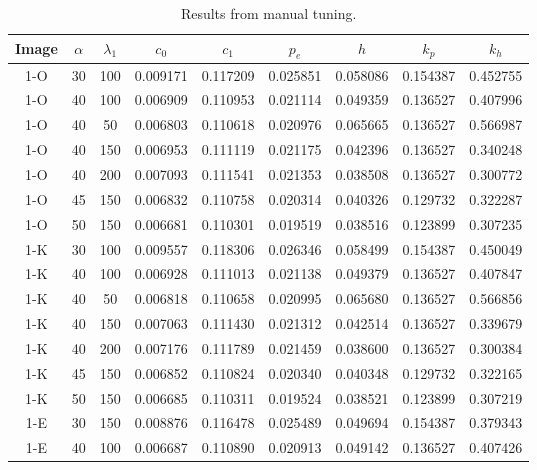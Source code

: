 \begin{center}
	\begin{longtable}{|c|c|c|c|c|c|c|c|c|}
	\caption{Results from manual tuning.} \label{tab:manualresults}\\
	\hline 
	Image & $\alpha$ & $\lambda_1$ & $c_0$ & $c_1$ & $p_e$ & $h$ & $k_p$ & $k_h$ \\ 	
	\hline \rowcolor{bad} 1-O &	30 &	100 &	0.009171 &	0.117209 &	0.025851 &	0.058086 &	0.154387 &	0.452755 \\
	\hline 1-O &	40 &	100	&	0.006909 &	0.110953 &	0.021114 &	0.049359 &	0.136527 &	0.407996 \\
	\hline 1-O &	40 &	50	&	0.006803 &	0.110618 &	0.020976 &	0.065665 &	0.136527 &	0.566987 \\
	\hline \rowcolor{acceptable} 1-O &	40 & 	150	&	0.006953 &	0.111119 &	0.021175 &	0.042396 &	0.136527 &	0.340248 \\
	\hline \rowcolor{acceptable} 1-O &	40 &	200 &	0.007093 &	0.111541 &	0.021353 &	0.038508 &	0.136527 &	0.300772 \\
	\hline \rowcolor{acceptable} 1-O &	45 &	150 &	0.006832 &	0.110758 &	0.020314 &	0.040326 &	0.129732 &	0.322287 \\
	\hline \rowcolor{acceptable} 1-O &	50 &	150 &	0.006681 &	0.110301 &	0.019519 &	0.038516 &	0.123899 &	0.307235 \\
	\hline \rowcolor{bad} 1-K &	30 &	100 &	0.009557 &	0.118306 &	0.026346 &	0.058499 &	0.154387 &	0.450049 \\
	\hline \rowcolor{acceptable} 1-K &	40 &	100 &	0.006928 &	0.111013 &	0.021138 &	0.049379 &	0.136527 &	0.407847 \\
	\hline 1-K &	40 &	50  &	0.006818 &	0.110658 &	0.020995 &	0.065680 &	0.136527 &	0.566856 \\
	\hline \rowcolor{acceptable} 1-K &	40 &	150 &	0.007063 &	0.111430 &	0.021312 &	0.042514 &	0.136527 &	0.339679 \\
	\hline \rowcolor{acceptable} 1-K &	40 &	200 &	0.007176 &	0.111789 &	0.021459 &	0.038600 &	0.136527 &	0.300384 \\
	\hline \rowcolor{acceptable} 1-K &	45 &	150 &	0.006852 &	0.110824 &	0.020340 &	0.040348 &	0.129732 &	0.322165 \\
	\hline \rowcolor{acceptable} 1-K &	50 &	150 &	0.006685 &	0.110311 &	0.019524 &	0.038521 &	0.123899 &	0.307219 \\
	\hline \rowcolor{bad} 1-E &	30 &	150 &	0.008876 &	0.116478 &	0.025489 &	0.049694 &	0.154387 &	0.379343 \\
	\hline \rowcolor{acceptable} 1-E &	40 &	100 &	0.006687 &	0.110890 &	0.020913 &	0.049142 &	0.136527 &	0.407426 \\

\end{longtable}
\end{center}
